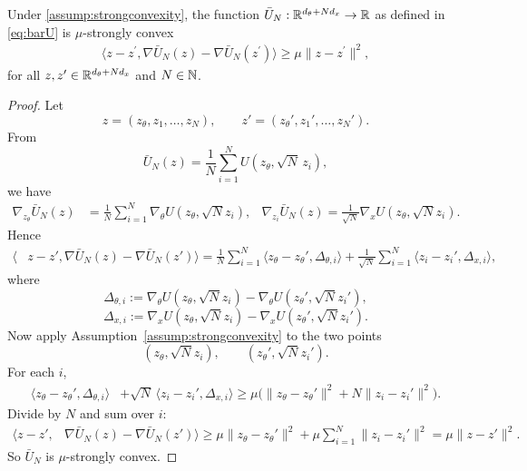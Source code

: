 \begin{lemma}\label{lem:strongconvexity_barU} Under \ref{assump:strongconvexity}, the function $\bar{U}_N: {\mathbb R}^{d_\theta + Nd_x} \to {\mathbb R}$ as defined in \eqref{eq:barU} is $\mu$-strongly convex
\begin{align*}
    \langle z-z^\prime, \nabla \bar{U}_N(z) - \nabla \bar{U}_N(z^\prime)\rangle \geq \mu \|z-z^\prime\|^2,
\end{align*}
for all $z, z^\prime \in {\mathbb R}^{d_\theta + Nd_x}$ and $N \in {\mathbb N}$.
\end{lemma}
\begin{proof}
Let
\[
z=(z_\theta,z_1,\dots,z_N),\qquad
z'=(z_\theta',z_1',\dots,z_N').
\]
From
\[
\bar U_N(z)=\frac1N\sum_{i=1}^N U(z_\theta,\sqrt N\,z_i),
\]
we have
\begin{align*}
\nabla_{z_\theta}\bar U_N(z) &=\frac1N\sum_{i=1}^N \nabla_\theta U(z_\theta,\sqrt N z_i), &
\nabla_{z_i}\bar U_N(z) = \frac1{\sqrt N}\nabla_x U(z_\theta,\sqrt N z_i).
\end{align*}
Hence
\begin{align*}
\langle& z-z', \nabla \bar U_N(z)-\nabla \bar U_N(z')\rangle =\frac1N\sum_{i=1}^N
\langle z_\theta-z_\theta',\Delta_{\theta,i}\rangle
+\frac1{\sqrt N}\sum_{i=1}^N
\langle z_i-z_i',\Delta_{x,i}\rangle,
\end{align*}
where
\[
\Delta_{\theta,i}:=\nabla_\theta U(z_\theta,\sqrt N z_i)-\nabla_\theta U(z_\theta',\sqrt N z_i'),
\]
\[
\Delta_{x,i}:=\nabla_x U(z_\theta,\sqrt N z_i)-\nabla_x U(z_\theta',\sqrt N z_i').
\]
Now apply Assumption~\ref{assump:strongconvexity} to the two points
\[
(z_\theta,\sqrt N z_i),\qquad (z_\theta',\sqrt N z_i').
\]
For each \(i\),
\begin{align*}
\langle z_\theta-z_\theta',\Delta_{\theta,i}\rangle
&+\sqrt N\,\langle z_i-z_i',\Delta_{x,i}\rangle
\ge \mu\big(\|z_\theta-z_\theta'\|^2+N\|z_i-z_i'\|^2\big).
\end{align*}
Divide by \(N\) and sum over \(i\):
\begin{align*}
\langle z-z', &\nabla \bar U_N(z)- \nabla \bar U_N(z')\rangle \ge
\mu\|z_\theta-z_\theta'\|^2+\mu\sum_{i=1}^N\|z_i-z_i'\|^2
=\mu\|z-z'\|^2.
\end{align*}
So \(\bar U_N\) is \(\mu\)-strongly convex.
\end{proof}


